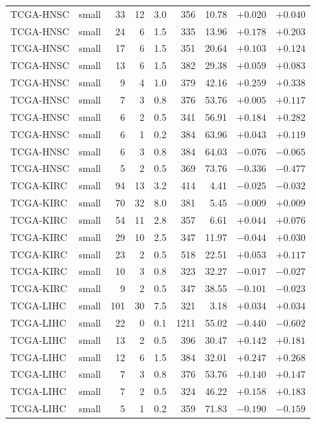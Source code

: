 \begin{longtable}{@{}llrrrrrrr@{}}
TCGA-HNSC & small & 33 & 12 & 3.0 & 356 & 10.78 & $+0.020$ & $+0.040$\\
TCGA-HNSC & small & 24 & 6 & 1.5 & 335 & 13.96 & $+0.178$ & $+0.203$\\
TCGA-HNSC & small & 17 & 6 & 1.5 & 351 & 20.64 & $+0.103$ & $+0.124$\\
TCGA-HNSC & small & 13 & 6 & 1.5 & 382 & 29.38 & $+0.059$ & $+0.083$\\
TCGA-HNSC & small & 9 & 4 & 1.0 & 379 & 42.16 & $+0.259$ & $+0.338$\\
TCGA-HNSC & small & 7 & 3 & 0.8 & 376 & 53.76 & $+0.005$ & $+0.117$\\
TCGA-HNSC & small & 6 & 2 & 0.5 & 341 & 56.91 & $+0.184$ & $+0.282$\\
TCGA-HNSC & small & 6 & 1 & 0.2 & 384 & 63.96 & $+0.043$ & $+0.119$\\
TCGA-HNSC & small & 6 & 3 & 0.8 & 384 & 64.03 & $-0.076$ & $-0.065$\\
TCGA-HNSC & small & 5 & 2 & 0.5 & 369 & 73.76 & $-0.336$ & $-0.477$\\
TCGA-KIRC & small & 94 & 13 & 3.2 & 414 & 4.41 & $-0.025$ & $-0.032$\\
TCGA-KIRC & small & 70 & 32 & 8.0 & 381 & 5.45 & $-0.009$ & $+0.009$\\
TCGA-KIRC & small & 54 & 11 & 2.8 & 357 & 6.61 & $+0.044$ & $+0.076$\\
TCGA-KIRC & small & 29 & 10 & 2.5 & 347 & 11.97 & $-0.044$ & $+0.030$\\
TCGA-KIRC & small & 23 & 2 & 0.5 & 518 & 22.51 & $+0.053$ & $+0.117$\\
TCGA-KIRC & small & 10 & 3 & 0.8 & 323 & 32.27 & $-0.017$ & $-0.027$\\
TCGA-KIRC & small & 9 & 2 & 0.5 & 347 & 38.55 & $-0.101$ & $-0.023$\\
TCGA-LIHC & small & 101 & 30 & 7.5 & 321 & 3.18 & $+0.034$ & $+0.034$\\
TCGA-LIHC & small & 22 & 0 & 0.1 & 1211 & 55.02 & $-0.440$ & $-0.602$\\
TCGA-LIHC & small & 13 & 2 & 0.5 & 396 & 30.47 & $+0.142$ & $+0.181$\\
TCGA-LIHC & small & 12 & 6 & 1.5 & 384 & 32.01 & $+0.247$ & $+0.268$\\
TCGA-LIHC & small & 7 & 3 & 0.8 & 376 & 53.76 & $+0.140$ & $+0.147$\\
TCGA-LIHC & small & 7 & 2 & 0.5 & 324 & 46.22 & $+0.158$ & $+0.183$\\
TCGA-LIHC & small & 5 & 1 & 0.2 & 359 & 71.83 & $-0.190$ & $-0.159$\\

\end{longtable}
